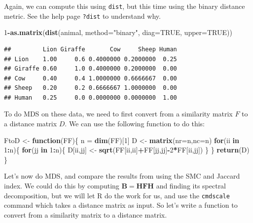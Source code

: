 \documentclass[]{book}
\newenvironment{Shaded}{\begin{snugshade}}{\end{snugshade}}
\newcommand{\ControlFlowTok}[1]{\textcolor[rgb]{0.13,0.29,0.53}{\textbf{#1}}}
\newcommand{\DataTypeTok}[1]{\textcolor[rgb]{0.13,0.29,0.53}{#1}}
\newcommand{\DecValTok}[1]{\textcolor[rgb]{0.00,0.00,0.81}{#1}}
\newcommand{\KeywordTok}[1]{\textcolor[rgb]{0.13,0.29,0.53}{\textbf{#1}}}
\newcommand{\NormalTok}[1]{#1}
\newcommand{\OperatorTok}[1]{\textcolor[rgb]{0.81,0.36,0.00}{\textbf{#1}}}
\newcommand{\OtherTok}[1]{\textcolor[rgb]{0.56,0.35,0.01}{#1}}
\newcommand{\StringTok}[1]{\textcolor[rgb]{0.31,0.60,0.02}{#1}}
\theoremstyle{definition}
\theoremstyle{definition}
\theoremstyle{definition}
\theoremstyle{remark}
\begin{document}
Again, we can compute this using \texttt{dist}, but this time using the binary distance metric. See the help page \texttt{?dist} to understand why.

\begin{Shaded}
\begin{Highlighting}[]
\DecValTok{1}\OperatorTok{-}\KeywordTok{as.matrix}\NormalTok{(}\KeywordTok{dist}\NormalTok{(animal, }\DataTypeTok{method=}\StringTok{"binary"}\NormalTok{, }\DataTypeTok{diag=}\OtherTok{TRUE}\NormalTok{, }\DataTypeTok{upper=}\OtherTok{TRUE}\NormalTok{))}
\end{Highlighting}
\end{Shaded}

\begin{verbatim}
##         Lion Giraffe       Cow     Sheep Human
## Lion    1.00     0.6 0.4000000 0.2000000  0.25
## Giraffe 0.60     1.0 0.4000000 0.2000000  0.00
## Cow     0.40     0.4 1.0000000 0.6666667  0.00
## Sheep   0.20     0.2 0.6666667 1.0000000  0.00
## Human   0.25     0.0 0.0000000 0.0000000  1.00
\end{verbatim}

To do MDS on these data, we need to first convert from a similarity matrix \(F\) to a distance matrix \(D\). We can use the following function to do this:

\begin{Shaded}
\begin{Highlighting}[]
\NormalTok{FtoD <-}\StringTok{ }\ControlFlowTok{function}\NormalTok{(FF)\{}
\NormalTok{  n =}\StringTok{ }\KeywordTok{dim}\NormalTok{(FF)[}\DecValTok{1}\NormalTok{]}
\NormalTok{  D <-}\StringTok{ }\KeywordTok{matrix}\NormalTok{(}\DataTypeTok{nr=}\NormalTok{n,}\DataTypeTok{nc=}\NormalTok{n)}
  \ControlFlowTok{for}\NormalTok{(ii }\ControlFlowTok{in} \DecValTok{1}\OperatorTok{:}\NormalTok{n)\{}
    \ControlFlowTok{for}\NormalTok{(jj }\ControlFlowTok{in} \DecValTok{1}\OperatorTok{:}\NormalTok{n)\{}
\NormalTok{      D[ii,jj] <-}\StringTok{ }\KeywordTok{sqrt}\NormalTok{(FF[ii,ii]}\OperatorTok{+}\NormalTok{FF[jj,jj]}\OperatorTok{-}\DecValTok{2}\OperatorTok{*}\NormalTok{FF[ii,jj])}
\NormalTok{    \}}
\NormalTok{  \}}
  \KeywordTok{return}\NormalTok{(D)}
\NormalTok{\}}
\end{Highlighting}
\end{Shaded}

Let's now do MDS, and compare the results from using the SMC and Jaccard index. We could do this by computing \(\mathbf B= \mathbf H\mathbf F\mathbf H\) and finding its spectral decomposition, but we will let R do the work for us, and use the \texttt{cmdscale} command which takes a distance matrix as input. So let's write a function to convert from a similarity matrix to a distance matrix.
\end{document}
